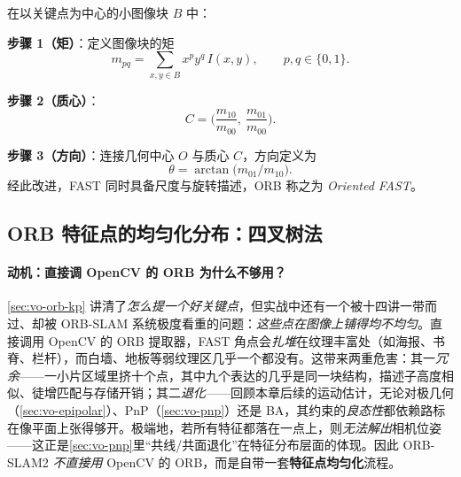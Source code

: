\begin{derivation}[灰度质心法求特征点方向]
\label{def:vo-centroid}
在以关键点为中心的小图像块 $B$ 中：

\textbf{步骤 1（矩）}：定义图像块的矩
\begin{equation}
  m_{pq}=\sum_{x,y\in B} x^{p}y^{q}\, I(x,y),\qquad p,q\in\{0,1\}.
  \label{eq:vo-moment}
\end{equation}

\textbf{步骤 2（质心）}：
\begin{equation}
  C=\Big(\frac{m_{10}}{m_{00}},\ \frac{m_{01}}{m_{00}}\Big).
  \label{eq:vo-centroid}
\end{equation}

\textbf{步骤 3（方向）}：连接几何中心 $O$ 与质心 $C$，方向定义为
\begin{equation}
  \theta=\arctan\!\big(m_{01}/m_{10}\big).
  \label{eq:vo-orientation}
\end{equation}
经此改进，FAST 同时具备尺度与旋转描述，ORB 称之为 \emph{Oriented FAST}。
\end{derivation}

\subsection{ORB 特征点的均匀化分布：四叉树法}
\label{sec:vo-orb-quadtree}

\paragraph{动机：直接调 OpenCV 的 ORB 为什么不够用？}
\cref{sec:vo-orb-kp} 讲清了\emph{怎么提一个好关键点}，但实战中还有一个被十四讲一带而过、却被 ORB-SLAM 系统极度看重的问题：\emph{这些点在图像上铺得均不均匀}。直接调用 OpenCV 的 ORB 提取器，FAST 角点会\emph{扎堆}在纹理丰富处（如海报、书脊、栏杆），而白墙、地板等弱纹理区几乎一个都没有\cite{murartal2017orbslam2}。这带来两重危害：其一\emph{冗余}——一小片区域里挤十个点，其中九个表达的几乎是同一块结构，描述子高度相似、徒增匹配与存储开销；其二\emph{退化}——回顾本章后续的运动估计，无论对极几何（\cref{sec:vo-epipolar}）、PnP（\cref{sec:vo-pnp}）还是 BA，其约束的\emph{良态性}都依赖路标在像平面上张得够开。极端地，若所有特征都落在一点上，则\emph{无法解出}相机位姿——这正是\cref{sec:vo-pnp}里“共线/共面退化”在特征分布层面的体现。因此 ORB-SLAM2 \emph{不直接用} OpenCV 的 ORB，而是自带一套\textbf{特征点均匀化}流程\cite{murartal2017orbslam2}。

